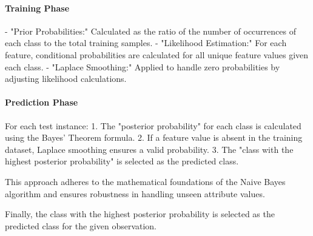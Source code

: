 \paragraph{Training Phase}
- "Prior Probabilities:" Calculated as the ratio of the number of occurrences of each class to the total training samples.
- "Likelihood Estimation:" For each feature, conditional probabilities are calculated for all unique feature values given each class.
- "Laplace Smoothing:" Applied to handle zero probabilities by adjusting likelihood calculations.

\paragraph{Prediction Phase}
For each test instance:
1. The "posterior probability" for each class is calculated using the Bayes' Theorem formula.
2. If a feature value is absent in the training dataset, Laplace smoothing ensures a valid probability.
3. The "class with the highest posterior probability" is selected as the predicted class.

This approach adheres to the mathematical foundations of the Naive Bayes algorithm and ensures robustness in handling unseen attribute values. 

Finally, the class with the highest posterior probability is selected as the predicted class for the given observation.
